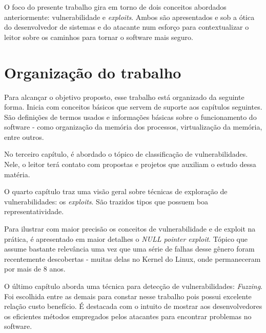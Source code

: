 	
	O foco do presente trabalho gira em torno de dois conceitos abordados anteriormente:
	vulnerabilidade e \textsl{exploits}. Ambos são apresentados e sob a ótica
	do desenvolvedor de sistemas e do atacante num esforço para contextualizar o leitor
	sobre os caminhos para tornar o software mais seguro.
	
	
	\section{Organização do trabalho}
		Para alcançar o objetivo proposto, esse trabalho está organizado da seguinte forma.
		Inicia com conceitos básicos que servem de suporte aos capítulos seguintes. São
		definições de termos usados e informações básicas sobre o funcionamento do software - como
		organização da memória dos processos, virtualização da memória, entre outros.

		No terceiro capítulo, é abordado o tópico de classificação de vulnerabilidades.
		Nele, o leitor terá contato com propostas e projetos que auxiliam o estudo dessa matéria.


		O quarto capítulo traz uma visão geral sobre técnicas de exploração de vulnerabilidades: os
		\textsl{exploits}. São trazidos tipos que possuem boa representatividade.


		Para ilustrar com maior precisão os conceitos de vulnerabilidade e de exploit na prática,
		é apresentado em maior detalhes o \textsl{NULL pointer exploit}. Tópico que assume
		bastante relevância uma vez que uma série de falhas desse gênero foram recentemente
		descobertas - muitas delas no Kernel do Linux, onde permaneceram por mais de 8 anos.


		O último capítulo aborda uma técnica para detecção de vulnerabilidades: \textsl{Fuzzing}.
		Foi escolhida entre as demais para constar nesse trabalho pois possui excelente relação
		custo benefício. É destacada com o intuito de mostrar aos desenvolvedores os eficientes
		métodos empregados pelos atacantes para encontrar problemas no software.
		
		

		

		

